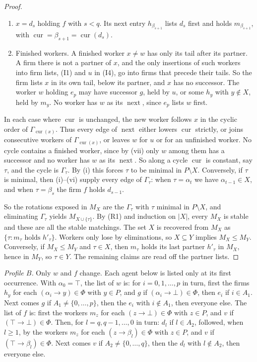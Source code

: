 \documentclass[11pt]{article}
\theoremstyle{definition}
\theoremstyle{remark}
\newcommand{\cur}{\operatorname{cur}}
\newcommand{\nxt}{\operatorname{next}}
\begin{document}
\begin{proof}
\begin{enumerate}[label=(\roman*)]
\item $x=d_s$ holding $f$ with $s<q$. Its next entry $h_{\beta_{s+1}}$ lists $d_s$ first and holds $m_{\beta_{s+1}}$, with $\cur=\beta_{s+1}=\cur(d_s)$.
\item Finished workers. A finished worker $x\ne w$ has only its tail after its partner. A firm there is not a partner of $x$, and the only insertions of such workers into firm lists, (I1) and $u$ in (I4), go into firms that precede their tails. So the firm lists $x$ in its own tail, below its partner, and $x$ has no successor. The worker $w$ holding $e_p$ may have successor $g$, held by $u$, or some $h_y$ with $y\notin X$, held by $m_y$. No worker has $w$ as its $\nxt$, since $e_p$ lists $w$ first.
\end{enumerate}
In each case where $\cur$ is unchanged, the new worker follows $x$ in the cyclic order of $\Gamma_{\cur(x)}$. Thus every edge of $\nxt$ either lowers $\cur$ strictly, or joins consecutive workers of $\Gamma_{\cur(x)}$, or leaves $w$ for $u$ or for an unfinished worker. No cycle contains a finished worker, since by (vii) only $w$ among them has a successor and no worker has $w$ as its $\nxt$. So along a cycle $\cur$ is constant, say $\tau$, and the cycle is $\Gamma_\tau$. By (i) this forces $\tau$ to be minimal in $P\setminus X$. Conversely, if $\tau$ is minimal, then (i)--(vi) supply every edge of $\Gamma_\tau$: when $\tau=\alpha_t$ we have $\alpha_{t-1}\in X$, and when $\tau=\beta_s$ the firm $f$ holds $d_{s-1}$.

So the rotations exposed in $M_X$ are the $\Gamma_\tau$ with $\tau$ minimal in $P\setminus X$, and eliminating $\Gamma_\tau$ yields $M_{X\cup\{\tau\}}$. By (R1) and induction on $|X|$, every $M_X$ is stable and these are all the stable matchings. The set $X$ is recovered from $M_X$ as $\{\tau: m_\tau\text{ holds }h'_\tau\}$. Workers only lose by eliminations, so $X\subseteq Y$ implies $M_X\le M_Y$. Conversely, if $M_X\le M_Y$ and $\tau\in X$, then $m_\tau$ holds its last partner $h'_\tau$ in $M_X$, hence in $M_Y$, so $\tau\in Y$. The remaining claims are read off the partner lists.
\end{proof}

\emph{Profile $B$.} Only $w$ and $f$ change. Each agent below is listed only at its first occurrence. With $\alpha_0=\top$, the list of $w$ is: for $i=0,1,\dots,p$ in turn, first the firms $h_y$ for each $(\alpha_i\to y)\in\Phi$ with $y\in P$, and $g$ if $(\alpha_i\to\bot)\in\Phi$, then $e_i$ if $i\in A_1$. Next comes $g$ if $A_1\ne\{0,\dots,p\}$, then the $e_i$ with $i\notin A_1$, then everyone else. The list of $f$ is: first the workers $m_z$ for each $(z\to\bot)\in\Phi$ with $z\in P$, and $v$ if $(\top\to\bot)\in\Phi$. Then, for $l=q,q-1,\dots,0$ in turn: $d_l$ if $l\in A_2$, followed, when $l\ge1$, by the workers $m_z$ for each $(z\to\beta_l)\in\Phi$ with $z\in P$, and $v$ if $(\top\to\beta_l)\in\Phi$. Next comes $v$ if $A_2\ne\{0,\dots,q\}$, then the $d_l$ with $l\notin A_2$, then everyone else.
\end{document}
